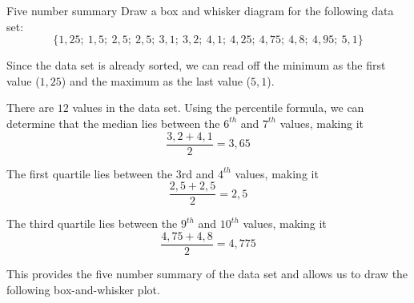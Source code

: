 \begin{wex}{Five number summary}{
    Draw a box and whisker diagram for the following data set:
    \begin{equation*}
      \{1,25;\ 1,5;\ 2,5;\ 2,5;\ 3,1;\ 3,2;\ 4,1;\ 4,25;\ 4,75;\ 4,8;\ 4,95;\ 5,1\}
    \end{equation*}
}{

  Since the data set is already sorted, we can read off the minimum as
  the first value ($1,25$) and the maximum as the last value ($5,1$).


  There are $12$ values in the data set. Using the percentile formula,
  we can determine that the median lies between the $6^{th}$ and $7^{th}$
  values, making it
  \begin{equation*}
    \frac{3,2 + 4,1}{2} = 3,65
  \end{equation*}

  The first quartile lies between the $3$rd and $4^{th}$ values, making
  it
  \begin{equation*}
    \frac{2,5 + 2,5}{2} = 2,5
  \end{equation*}

  The third quartile lies between the $9^{th}$ and $10^{th}$ values, making
  it
  \begin{equation*}
    \frac{4,75 + 4,8}{2} = 4,775
  \end{equation*}

  This provides the five number summary of the data set and allows us
  to draw the following box-and-whisker plot.

  \begin{center}
  \end{center}
}
\end{wex}

